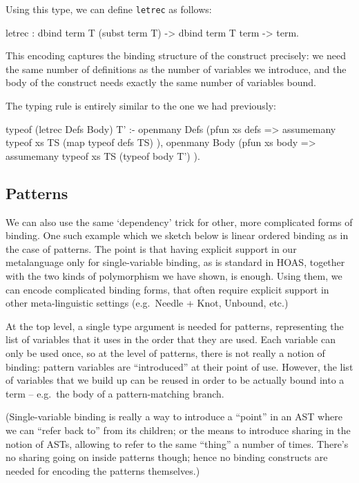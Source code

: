 \documentclass[format=acmlarge,review,anonymous]{acmart}\settopmatter{printfolios=true}
\begin{document}
Using this type, we can define \texttt{letrec} as follows:

\begin{codequote}
letrec : dbind term T (subst term T) -> dbind term T term -> term.
\end{codequote}

This encoding captures the binding structure of the construct precisely: we need the same number of
definitions as the number of variables we introduce, and the body of the construct needs exactly the
same number of variables bound.

The typing rule is entirely similar to the one we had previously:

\begin{codequote}
typeof (letrec Defs Body) T' :-
  openmany Defs (pfun xs defs =>
    assumemany typeof xs TS (map typeof defs TS)
  ),
  openmany Body (pfun xs body =>
    assumemany typeof xs TS (typeof body T')
  ).
\end{codequote}

\subsection{Patterns}

We can also use the same `dependency' trick for other, more complicated forms of binding. One such
example which we sketch below is linear ordered binding as in the case of patterns. The point is
that having explicit support in our metalanguage only for single-variable binding, as is standard in
HOAS, together with the two kinds of polymorphism we have shown, is enough. Using them, we can
encode complicated binding forms, that often require explicit support in other meta-linguistic
settings (e.g.~Needle + Knot, Unbound, etc.)

At the top level, a single type argument is needed for patterns, representing the list of variables
that it uses in the order that they are used. Each variable can only be used once, so at the level
of patterns, there is not really a notion of binding: pattern variables are ``introduced'' at their
point of use. However, the list of variables that we build up can be reused in order to be actually
bound into a term -- e.g.~the body of a pattern-matching branch.

(Single-variable binding is really a way to introduce a ``point'' in an AST where we can ``refer
back to'' from its children; or the means to introduce sharing in the notion of ASTs, allowing to
refer to the same ``thing'' a number of times. There's no sharing going on inside patterns though;
hence no binding constructs are needed for encoding the patterns themselves.)
\end{document}
